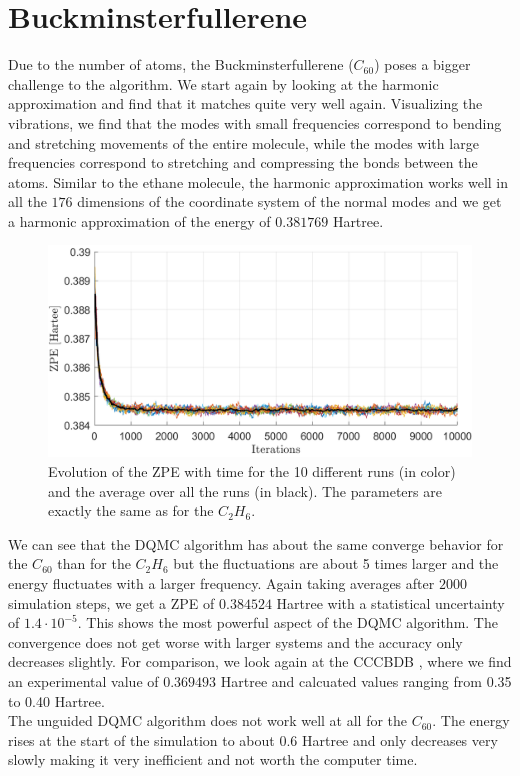 \documentclass [12pt]{report}
\begin{document}
\section{Buckminsterfullerene}
Due to the number of atoms, the Buckminsterfullerene ($C_{60}$) poses a bigger challenge to the algorithm. We start again by looking at the harmonic approximation and find that it matches quite very well again. Visualizing the vibrations, we find that the modes with small frequencies correspond to bending and stretching movements of the entire molecule, while the modes with large frequencies correspond to stretching and compressing the bonds between the atoms. 
Similar to the ethane molecule, the harmonic approximation works well in all the $176$ dimensions of the coordinate system of the normal modes and we get a harmonic approximation of the energy of $0.381769$ Hartree.

\begin{figure}[H]
\includegraphics[width=\linewidth] {c60_1.png}
\caption{Evolution of the ZPE with time for the 10 different runs (in color) and the average over all the runs (in black). The parameters are exactly the same as for the $C_2H_6$.} \label{c60_1}
\end{figure}

We can see that the DQMC algorithm has about the same converge behavior for the $C_{60}$ than for the $C_2H_6$ but the fluctuations are about 5 times larger and the energy fluctuates with a larger frequency. Again taking averages after $2000$ simulation steps, we get a ZPE of $0.384524$ Hartree with a statistical uncertainty of $1.4 \cdot 10^{-5}$. This shows the most powerful aspect of the DQMC algorithm. The convergence does not get worse with larger systems and the accuracy only decreases slightly. For comparison, we look again at the CCCBDB \cite{cccbdb}, where we find an experimental value of  $0.369493$ Hartree and calcuated values ranging from 0.35 to 0.40 Hartree.\\
The unguided DQMC algorithm does not work well at all for the $C_{60}$. The energy rises at the start of the simulation to about 0.6 Hartree and only decreases very  slowly making it very inefficient and not worth the computer time.
\newpage
\end{document}
